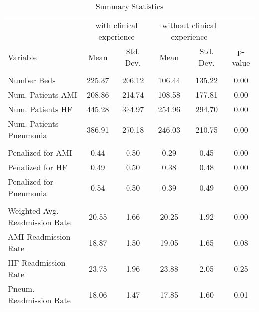 \begin{table}[h]

\caption{Summary Statistics}
\centering
\begin{tabular}[t]{lccccc}
\toprule
\multicolumn{1}{c}{ } & \multicolumn{2}{c}{with clinical experience} & \multicolumn{2}{c}{without clinical experience} & \multicolumn{1}{c}{ } \\
\cmidrule(l{3pt}r{3pt}){2-3} \cmidrule(l{3pt}r{3pt}){4-5}
Variable & Mean & Std. Dev. & Mean & Std. Dev. & p-value\\
\midrule
\addlinespace[0.3em]
\multicolumn{6}{l}{\textbf{Hospital Characteristics}}\\
\hspace{1em}Number Beds & 225.37 & 206.12 & 106.44 & 135.22 & 0.00\\
\hspace{1em}Num. Patients AMI & 208.86 & 214.74 & 108.58 & 177.81 & 0.00\\
\hspace{1em}Num. Patients HF & 445.28 & 334.97 & 254.96 & 294.70 & 0.00\\
\hspace{1em}Num. Patients Pneumonia & 386.91 & 270.18 & 246.03 & 210.75 & 0.00\\
\addlinespace[0.3em]
\multicolumn{6}{l}{\textbf{Penalty Variables}}\\
\hspace{1em}Penalized for AMI & 0.44 & 0.50 & 0.29 & 0.45 & 0.00\\
\hspace{1em}Penalized for HF & 0.49 & 0.50 & 0.38 & 0.48 & 0.00\\
\hspace{1em}Penalized for Pneumonia & 0.54 & 0.50 & 0.39 & 0.49 & 0.00\\
\addlinespace[0.3em]
\multicolumn{6}{l}{\textbf{Readmission Outcome Variables}}\\
\hspace{1em}Weighted Avg. Readmission Rate & 20.55 & 1.66 & 20.25 & 1.92 & 0.00\\
\hspace{1em}AMI Readmission Rate & 18.87 & 1.50 & 19.05 & 1.65 & 0.08\\
\hspace{1em}HF Readmission Rate & 23.75 & 1.96 & 23.88 & 2.05 & 0.25\\
\hspace{1em}Pneum. Readmission Rate & 18.06 & 1.47 & 17.85 & 1.60 & 0.01\\

\end{tabular}
\end{table}
